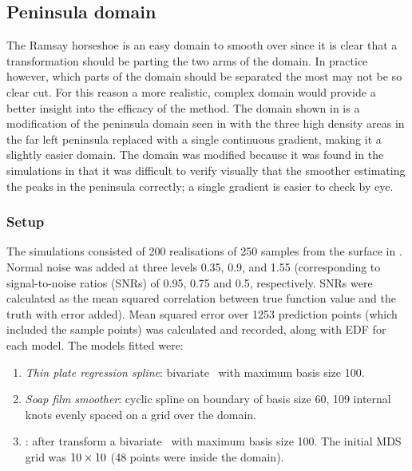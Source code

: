 \subsection{Peninsula domain}
\label{mds-wt2-sim}

\label{cor-r36}The Ramsay horseshoe is an easy domain to smooth over since it is clear that a transformation should be parting the two arms of the domain. In practice however, which parts of the domain should be separated the most may not be so clear cut. For this reason a more realistic, complex domain would provide a better insight into the efficacy of the method. The domain shown in  is a modification of the peninsula domain seen in  with the three high density areas in the far left peninsula replaced with a single continuous gradient, making it a slightly easier domain. The domain was modified because it was found in the simulations in  that it was difficult to verify visually that the smoother estimating the peaks in the peninsula correctly; a single gradient is easier to check by eye.

\subsubsection{Setup}

The simulations consisted of 200 realisations of 250 samples from the surface in . Normal noise was added at three levels  0.35, 0.9, and 1.55 (corresponding to signal-to-noise ratios (SNRs) of 0.95, 0.75 and 0.5, respectively. SNRs were calculated as the mean squared correlation between true function value and the truth with error added). Mean squared error over 1253 prediction points (which included the sample points) was calculated and recorded, along with EDF for each model. The models fitted were:
\begin{enumerate}
\item \emph{Thin plate regression spline}: bivariate \tprs\ with maximum basis size 100. 
\item \emph{Soap film smoother}: cyclic spline on boundary of basis size 60, 109 internal knots evenly spaced on a grid over the domain.
\item \emph{\mdsap}: after transform a bivariate \tprs\ with maximum basis size 100. The initial MDS grid was $10 \times 10$ (48 points were inside the domain).
\end{enumerate} 

